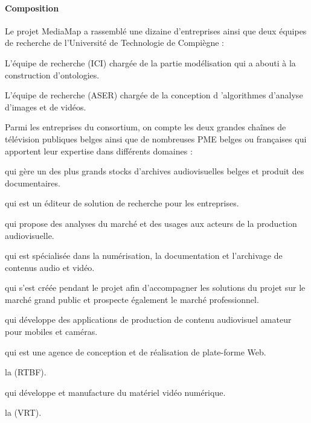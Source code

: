 \paragraph{Composition}
Le projet MediaMap a rassemblé une dizaine d'entreprises ainsi que deux équipes de recherche de l'Université de Technologie de Compiègne :
\begin{liste}
	\item L'équipe de recherche  (ICI) chargée de la partie modélisation qui a abouti à la construction d'ontologies.

	\item L'équipe de recherche  (ASER) chargée de la conception d 'algorithmes d'analyse d'images et de vidéos.
\end{liste}


Parmi les entreprises du consortium, on compte les deux grandes chaînes de télévision publiques belges ainsi que de nombreuses PME belges ou françaises qui apportent leur expertise dans différents domaines :
\begin{liste}
	\item {} qui gère un des plus grands stocks d'archives audiovisuelles belges et produit des documentaires.

	\item {} qui est un éditeur de solution de recherche pour les entreprises.

	\item {} qui propose des analyses du marché et des usages aux acteurs de la production audiovisuelle.

	\item {} qui est spécialisée dans la numérisation, la documentation et l'archivage de contenus audio et vidéo.

	\item {} qui s'est créée pendant le projet afin d'accompagner les solutions du projet sur le marché grand public et prospecte également le marché professionnel.

	\item {} qui développe des applications de production de contenu audiovisuel amateur pour mobiles et caméras.

	\item {} qui est une agence de conception et de réalisation de plate-forme Web.

	\item la  (RTBF).

	\item {} qui développe et manufacture du matériel vidéo numérique.

	\item la  (VRT).
\end{liste}









